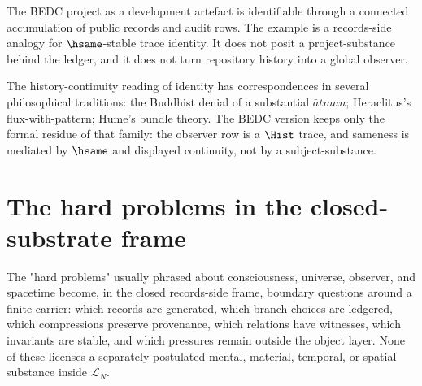 \begin{example}
\label{ex:consciousness-universe-bedc-project-identity}
The BEDC project as a development artefact is identifiable through a connected accumulation of public records and audit rows. The example is a records-side analogy for $\hsame$-stable trace identity. It does not posit a project-substance behind the ledger, and it does not turn repository history into a global observer.
\end{example}

\begin{remark}
\label{rem:consciousness-universe-buddhist-heraclitean}
The history-continuity reading of identity has correspondences in several philosophical traditions: the Buddhist denial of a substantial $\bar{a}tman$; Heraclitus's flux-with-pattern; Hume's bundle theory. The BEDC version keeps only the formal residue of that family: the observer row is a $\Hist$ trace, and sameness is mediated by $\hsame$ and displayed continuity, not by a subject-substance.
\end{remark}

\section{The hard problems in the closed-substrate frame}
\label{sec:consciousness-universe-hard-problems-in-frame}

\begin{principle}
\label{prin:consciousness-universe-hard-problems-as-structural}
The "hard problems" usually phrased about consciousness, universe, observer, and spacetime become, in the closed records-side frame, boundary questions around a finite carrier: which records are generated, which branch choices are ledgered, which compressions preserve provenance, which relations have witnesses, which invariants are stable, and which pressures remain outside the object layer. None of these licenses a separately postulated mental, material, temporal, or spatial substance inside $\mathcal{L}_N$.
\end{principle}

